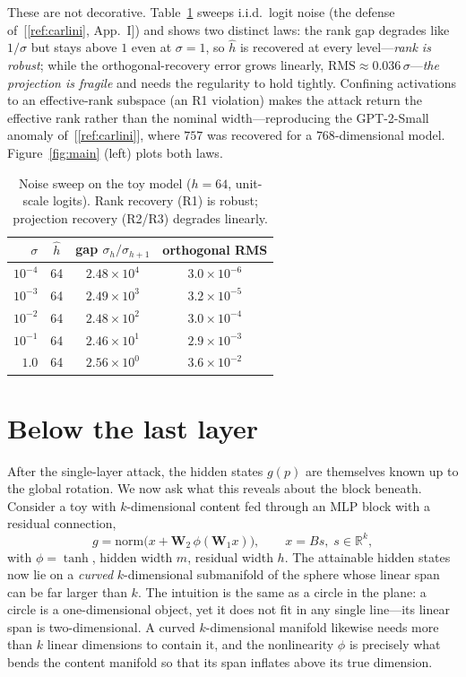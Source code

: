 \documentclass[11pt]{article}
\newcommand{\R}{\mathbb{R}}
\newcommand{\W}{\mathbf{W}}
\newcommand{\hidden}{g}
\begin{document}
These are not decorative. Table~\ref{tab:noise} sweeps i.i.d.\ logit noise (the
defense of~[\ref{ref:carlini}, App.~I]) and shows two distinct laws: the rank
gap degrades like $1/\sigma$ but stays above $1$ even at $\sigma=1$, so $\hat h$
is recovered at every level---\emph{rank is robust}; while the orthogonal-recovery
error grows linearly, $\mathrm{RMS}\approx0.036\,\sigma$---\emph{the projection is
fragile} and needs the regularity to hold tightly. Confining activations to an
effective-rank subspace (an R1 violation) makes the attack return the effective
rank rather than the nominal width---reproducing the GPT-2-Small anomaly
of~[\ref{ref:carlini}], where $757$ was recovered for a $768$-dimensional model.
Figure~\ref{fig:main} (left) plots both laws.

\begin{table}[t]
\centering
\caption{Noise sweep on the toy model ($h=64$, unit-scale logits). Rank
recovery (R1) is robust; projection recovery (R2/R3) degrades linearly.}
\label{tab:noise}
\begin{tabular}{rccc}
\toprule
$\sigma$ & $\hat h$ & gap $\sigma_h/\sigma_{h+1}$ & orthogonal RMS \\
\midrule
$10^{-4}$ & 64 & $2.48\times10^{4}$ & $3.0\times10^{-6}$ \\
$10^{-3}$ & 64 & $2.49\times10^{3}$ & $3.2\times10^{-5}$ \\
$10^{-2}$ & 64 & $2.48\times10^{2}$ & $3.0\times10^{-4}$ \\
$10^{-1}$ & 64 & $2.46\times10^{1}$ & $2.9\times10^{-3}$ \\
$1.0$     & 64 & $2.56\times10^{0}$ & $3.6\times10^{-2}$ \\
\bottomrule
\end{tabular}
\end{table}

\section{Below the last layer}\label{sec:below}

After the single-layer attack, the hidden states $\hidden(p)$ are themselves
known up to the global rotation. We now ask what this reveals about the block
beneath. Consider a toy with $k$-dimensional content fed through an MLP block
with a residual connection,
\[
  \hidden=\mathrm{norm}\bigl(x+\W_2\,\phi(\W_1 x)\bigr),\qquad x=Bs,\;s\in\R^k,
\]
with $\phi=\tanh$, hidden width $m$, residual width $h$. The attainable hidden
states now lie on a \emph{curved} $k$-dimensional submanifold of the sphere whose
linear span can be far larger than $k$. The intuition is the same as a circle in
the plane: a circle is a one-dimensional object, yet it does not fit in any
single line---its linear span is two-dimensional. A curved $k$-dimensional
manifold likewise needs more than $k$ linear dimensions to contain it, and the
nonlinearity $\phi$ is precisely what bends the content manifold so that its span
inflates above its true dimension.
\end{document}
